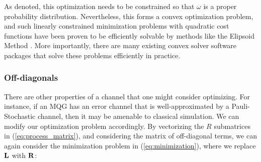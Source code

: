 \documentclass[aps,nofootinbib,pra,notitlepage,twocolumn]{revtex4-1}
\begin{document}
As denoted, this optimization needs to be constrained so that $\omega$ is a proper probability distribution. Nevertheless, this forms a convex optimization problem, and such linearly constrained minimization problems with quadratic cost functions have been proven to be efficiently solvable by methods like the Elipsoid Method \cite{wright1999numerical, khachiyan}. More importantly, there are many existing convex solver software packages that solve these problems efficiently in practice.






\subsubsection{Off-diagonals} %
\label{sub:off_diagonals}
There are other properties of a channel that one might consider optimizing. For instance, if an MQG has an error channel that is well-approximated by a Pauli-Stochastic channel, then it may be amenable to classical simulation. We can modify our optimization problem accordingly. By vectorizing the $R$ submatrices in (\ref{eq:process_matrix}), and considering the matrix of off-diagonal terms, we can again consider the minimization problem in (\ref{eq:minimization}), where we replace $\bold{L}$ with $\bold{R}$:
\end{document}
